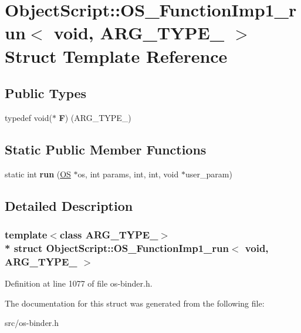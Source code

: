 \hypertarget{struct_object_script_1_1_o_s___function_imp1__run_3_01void_00_01_01_01_a_r_g___t_y_p_e__1_01_4}{}\section{Object\+Script\+:\+:O\+S\+\_\+\+Function\+Imp1\+\_\+run$<$ void, A\+R\+G\+\_\+\+T\+Y\+P\+E\+\_ $>$ Struct Template Reference}
\label{struct_object_script_1_1_o_s___function_imp1__run_3_01void_00_01_01_01_a_r_g___t_y_p_e__1_01_4}
\subsection*{Public Types}
\begin{DoxyCompactItemize}
\item 
typedef void($\ast$ {\bfseries F}) (A\+R\+G\+\_\+\+T\+Y\+P\+E\+\_)\hypertarget{struct_object_script_1_1_o_s___function_imp1__run_3_01void_00_01_01_01_a_r_g___t_y_p_e__1_01_4_a02112528fe5332455572dc830cd75b39}{}\label{struct_object_script_1_1_o_s___function_imp1__run_3_01void_00_01_01_01_a_r_g___t_y_p_e__1_01_4_a02112528fe5332455572dc830cd75b39}

\end{DoxyCompactItemize}
\subsection*{Static Public Member Functions}
\begin{DoxyCompactItemize}
\item 
static int {\bfseries run} (\hyperlink{class_object_script_1_1_o_s}{OS} $\ast$os, int params, int, int, void $\ast$user\+\_\+param)\hypertarget{struct_object_script_1_1_o_s___function_imp1__run_3_01void_00_01_01_01_a_r_g___t_y_p_e__1_01_4_ad777c36de5d7bf65c210faa8d863cbe5}{}\label{struct_object_script_1_1_o_s___function_imp1__run_3_01void_00_01_01_01_a_r_g___t_y_p_e__1_01_4_ad777c36de5d7bf65c210faa8d863cbe5}

\end{DoxyCompactItemize}


\subsection{Detailed Description}
\subsubsection*{template$<$class A\+R\+G\+\_\+\+T\+Y\+P\+E\+\_$>$\\*
struct Object\+Script\+::\+O\+S\+\_\+\+Function\+Imp1\+\_\+run$<$ void,   A\+R\+G\+\_\+\+T\+Y\+P\+E\+\_ $>$}



Definition at line 1077 of file os-\/binder.\+h.



The documentation for this struct was generated from the following file\+:\begin{DoxyCompactItemize}
\item 
src/os-\/binder.\+h\end{DoxyCompactItemize}
